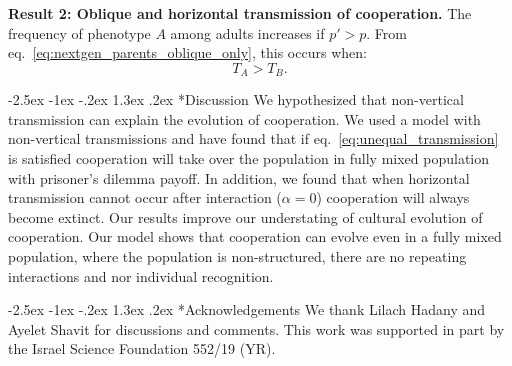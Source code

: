 \documentclass[12pt]{extarticle}
\makeatletter
\renewcommand\section{\@startsection {section}{1}{\z@}%
     {-2.5ex \@plus -1ex \@minus -.2ex}%
     {1.3ex \@plus.2ex}%
    {\Large\bfseries}}
\makeatother
\begin{document}
\textbf{Result 2: Oblique and horizontal transmission of cooperation.} The frequency of phenotype $A$ among adults increases if $p'>p$.
From eq.~\ref{eq:nextgen_parents_oblique_only}, this occurs when:
\begin{equation} \label{eq:oblique_only_result}
T_A>T_B. 
\end{equation}

\section*{Discussion}
We hypothesized that non-vertical transmission can explain the evolution of cooperation. We used a model with non-vertical transmissions and have found that if eq.~\ref{eq:unequal_transmission} is satisfied cooperation will take over the population in fully mixed population with prisoner's dilemma payoff. In addition, we found that when horizontal transmission cannot occur after interaction ($\alpha = 0$) cooperation will always become extinct. 
Our results improve our understating of cultural evolution of cooperation. Our model shows that cooperation can evolve even in a fully mixed population, where the population is non-structured, there are no repeating interactions and nor individual recognition.

{\small
\section*{Acknowledgements}
We thank Lilach Hadany and Ayelet Shavit for discussions and comments.
This work was supported in part by
the Israel Science Foundation 552/19 (YR).
}




\newpage
\end{document}
